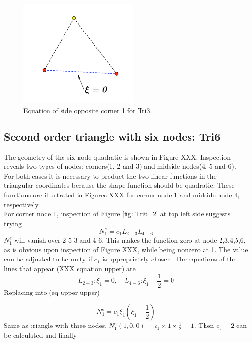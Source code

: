 \begin{figure}[h]
	\begin{center}
		\includegraphics[width=6cm,clip]{Tri3_2.pdf}			
		\caption{Equation of side opposite corner 1 for Tri3.} \label{fig: Tri3_2}
	\end{center} 
\end{figure}

\subsection{Second order triangle with six nodes: Tri6}
The geometry of the six-node quadratic is shown in Figure XXX. Inspection reveals two types of nodes: corners(1, 2 and 3) and midside nodes(4, 5 and 6). For both cases it is necessary to product the two linear functions in the triangular coordinates because the shape function should be quadratic. These functions are illustrated in Figures XXX for corner node 1 and midside node 4, respectively. \\
For corner node 1, inspection of Figure \ref{fig: Tri6_2} at top left side suggests trying
\begin{equation}
N_1^e = c_1L_{2-3}L_{4-6}
\end{equation}
$N_1^e$ will vanish over 2-5-3 and 4-6. This makes the function zero at node 2,3,4,5,6, as is obvious upon inspection of Figure XXX, while being nonzero at 1. The value can be adjusted to be unity if $c_1$ is appropriately chosen. The equations of the lines that appear (XXX equation upper) are
\begin{equation}
L_{2-3}: \xi_1 = 0, \quad L_{4-6}: \xi_1 - \frac{1}{2} = 0
\end{equation}
Replacing into (eq upper upper)

\begin{equation}
N_1^e = c_1\xi_1 \left(\xi_1 - \frac{1}{2}\right)
\end{equation}
Same as triangle with three nodes, $N_1^e\left(1,0,0\right) = c_1 \times 1 \times \frac{1}{2} = 1$. Then $c_1 = 2$ can be calculated and finally 


